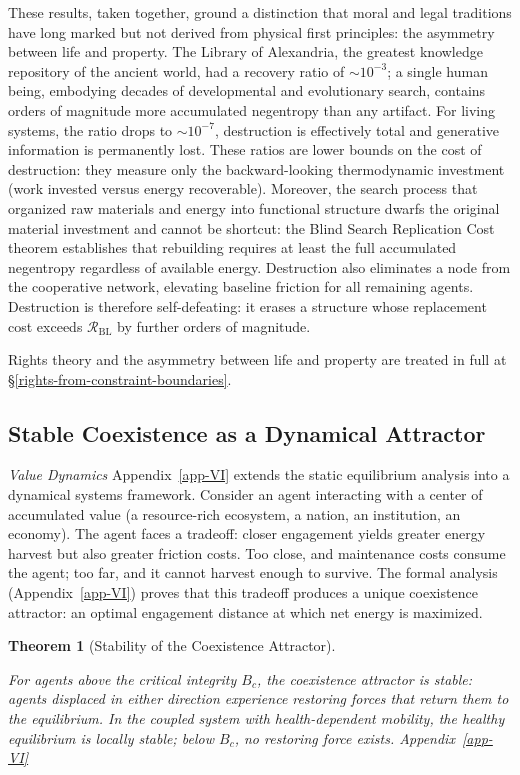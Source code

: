 \documentclass[11pt]{article}
\theoremstyle{plain}
\newtheorem{theorem}{Theorem}
\theoremstyle{definition}
\theoremstyle{remark}
\let\origsubsection\subsection
\renewcommand{\subsection}{\needspace{7\baselineskip}\origsubsection}
\begin{document}
These results, taken together, ground a distinction that moral and legal
traditions have long marked but not derived from physical first
principles: the asymmetry between life and property. The Library of
Alexandria, the greatest knowledge repository of the ancient world, had
a recovery ratio of \(\sim 10^{-3}\); a single human being, embodying
decades of developmental and evolutionary search, contains orders of
magnitude more accumulated negentropy than any artifact. For living
systems, the ratio drops to \(\sim 10^{-7}\), destruction is effectively
total and generative information is permanently lost. These ratios are
lower bounds on the cost of destruction: they measure only the
backward-looking thermodynamic investment (work invested versus energy
recoverable). Moreover, the search process that organized raw materials
and energy into functional structure dwarfs the original material
investment and cannot be shortcut: the Blind Search Replication Cost
theorem establishes that rebuilding requires at least the full
accumulated negentropy regardless of available energy. Destruction also
eliminates a node from the cooperative network, elevating baseline
friction for all remaining agents. Destruction is therefore
self-defeating: it erases a structure whose replacement cost exceeds
\(\mathcal{R}_{\text{BL}}\) by further orders of magnitude.

Rights theory and the asymmetry between life and property are treated in
full at §\ref{rights-from-constraint-boundaries}.

\subsection{Stable Coexistence as a Dynamical
Attractor}\label{stable-coexistence-as-a-dynamical-attractor}

\emph{Value Dynamics} Appendix~\ref{app-VI} extends the static
equilibrium analysis into a dynamical systems framework. Consider an
agent interacting with a center of accumulated value (a resource-rich
ecosystem, a nation, an institution, an economy). The agent faces a
tradeoff: closer engagement yields greater energy harvest but also
greater friction costs. Too close, and maintenance costs consume the
agent; too far, and it cannot harvest enough to survive. The formal
analysis (Appendix~\ref{app-VI}) proves that this tradeoff produces a
unique coexistence attractor: an optimal engagement distance at which
net energy is maximized.

\begin{theorem}[Stability of the Coexistence Attractor]
\label{ethics-thm-coexistence}

For agents above the critical integrity $B_c$, the coexistence attractor is stable: agents displaced in either direction experience restoring forces that return them to the equilibrium. In the coupled system with health-dependent mobility, the healthy equilibrium is locally stable; below $B_c$, no restoring force exists. Appendix~\ref{app-VI}
\end{theorem}
\end{document}
